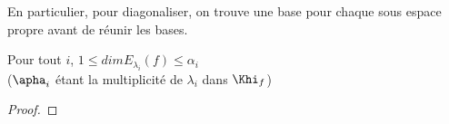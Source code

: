 \documentclass[../main.tex]{subfile}
\begin{document}

\begin{rema}
	En particulier, pour diagonaliser, on trouve une base pour chaque sous espace propre avant de réunir les bases.
\end{rema}

\begin{prop}
	Pour tout $i$, $1 \leq dim E_{\lambda_i}(f) \leq \alpha_i$\\
	($\apha_i$ étant la multiplicité de $\lambda_i$ dans $\Khi_f$)
\end{prop}

\begin{proof}
\end{proof}
\end{document}
